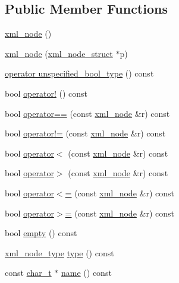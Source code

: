 \subsection*{Public Member Functions}
\begin{DoxyCompactItemize}
\item 
\hyperlink{classpugi_1_1xml__node_a36ec0eb8b399d71f6b55be0e181c69f9}{xml\-\_\-node} ()
\item 
\hyperlink{classpugi_1_1xml__node_afc9b1ed8891dfed9ce5ab5288a9ad4a1}{xml\-\_\-node} (\hyperlink{structpugi_1_1xml__node__struct}{xml\-\_\-node\-\_\-struct} $\ast$p)
\item 
\hyperlink{classpugi_1_1xml__node_af30001c73a3454a1e3794a850d3963c0}{operator unspecified\-\_\-bool\-\_\-type} () const 
\item 
bool \hyperlink{classpugi_1_1xml__node_a03c028fd83e07cda3f433f9eea3466ff}{operator!} () const 
\item 
bool \hyperlink{classpugi_1_1xml__node_aaf46fa45a1a117ca95867f37ade363c2}{operator==} (const \hyperlink{classpugi_1_1xml__node}{xml\-\_\-node} \&r) const 
\item 
bool \hyperlink{classpugi_1_1xml__node_aa31095e51422a8a11b8d4832e0db71ed}{operator!=} (const \hyperlink{classpugi_1_1xml__node}{xml\-\_\-node} \&r) const 
\item 
bool \hyperlink{classpugi_1_1xml__node_a2a57731a8d90392f88febf551bd5a924}{operator$<$} (const \hyperlink{classpugi_1_1xml__node}{xml\-\_\-node} \&r) const 
\item 
bool \hyperlink{classpugi_1_1xml__node_a983e49938a893181fd8cc905c4c67f64}{operator$>$} (const \hyperlink{classpugi_1_1xml__node}{xml\-\_\-node} \&r) const 
\item 
bool \hyperlink{classpugi_1_1xml__node_a09568e579d8c1b6bff12594bfb4246b6}{operator$<$=} (const \hyperlink{classpugi_1_1xml__node}{xml\-\_\-node} \&r) const 
\item 
bool \hyperlink{classpugi_1_1xml__node_a8c89c4333fdd22f19714a945895d2e39}{operator$>$=} (const \hyperlink{classpugi_1_1xml__node}{xml\-\_\-node} \&r) const 
\item 
bool \hyperlink{classpugi_1_1xml__node_a2c416c45fcd27a9cf4e7914d560a0cc4}{empty} () const 
\item 
\hyperlink{namespacepugi_a137e94a038e4ab0ada6477cf7f6153a9}{xml\-\_\-node\-\_\-type} \hyperlink{classpugi_1_1xml__node_ab881e8c41edc84bf7507591d1ad8ead4}{type} () const 
\item 
const \hyperlink{namespacepugi_aef5a7a62cba0507542220ea15afe39df}{char\-\_\-t} $\ast$ \hyperlink{classpugi_1_1xml__node_ac765caace42ecf252d90aea81e09df57}{name} () const 

\end{DoxyCompactItemize}
